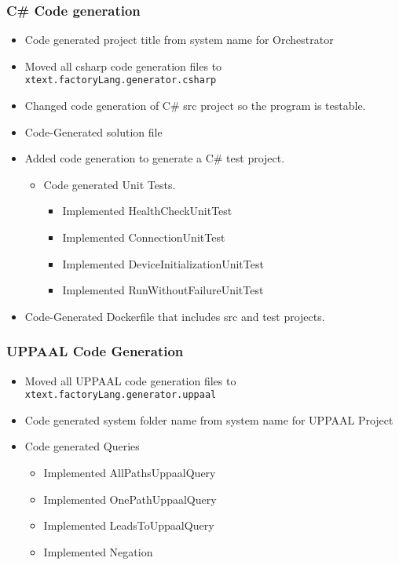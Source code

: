 \hypertarget{c-code-generation}{%
\subsubsection{C\# Code generation}\label{c-code-generation}}

\begin{itemize}
\tightlist
\item
  Code generated project title from system name for Orchestrator
\item
  Moved all csharp code generation files to
  \texttt{xtext.factoryLang.generator.csharp}
\item
  Changed code generation of C\# src project so the program is testable.
\item
  Code-Generated solution file
\item
  Added code generation to generate a C\# test project.

  \begin{itemize}
  \tightlist
  \item
    Code generated Unit Tests.

    \begin{itemize}
    \tightlist
    \item
      Implemented HealthCheckUnitTest
    \item
      Implemented ConnectionUnitTest
    \item
      Implemented DeviceInitializationUnitTest
    \item
      Implemented RunWithoutFailureUnitTest
    \end{itemize}
  \end{itemize}
\item
  Code-Generated Dockerfile that includes src and test projects.
\end{itemize}

\hypertarget{uppaal-code-generation}{%
\subsubsection{UPPAAL Code Generation}\label{uppaal-code-generation}}

\begin{itemize}
\tightlist
\item
  Moved all UPPAAL code generation files to
  \texttt{xtext.factoryLang.generator.uppaal}
\item
  Code generated system folder name from system name for UPPAAL Project
\item
  Code generated Queries

  \begin{itemize}
  \tightlist
  \item
    Implemented AllPathsUppaalQuery
  \item
    Implemented OnePathUppaalQuery
  \item
    Implemented LeadsToUppaalQuery
  \item
    Implemented Negation
  \end{itemize}
\end{itemize}
